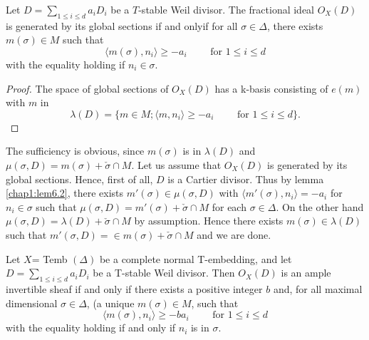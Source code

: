 \begin{lemma}\label{chap1:lem6.3}
Let $D = \sum  \limits_{1 \leq i \leq d} a_i D_i  $ be a $T$-stable
Weil divisor. The fractional ideal $O_X(D)$ is generated by its global
sections if and only\pageoriginale if for all $\sigma \in \Delta$,
there exists $m(\sigma) \in M$ such that   
$$
\langle m (\sigma), n_i \rangle \geq -a_i \qquad \text{ for } 1 \leq i \leq d
$$
with the equality holding if $n_i \in \sigma$.
\end{lemma}

\begin{proof}
The space of global sections of $O_X(D)$ has a k-basis consisting of
$e(m)$ with $m$ in  
$$
\lambda(D) = \{ m \in M ; \langle m , n_i \rangle \geq -a_i \qquad \text{ for } 1
\leq i \leq d \}. 
$$
\end{proof}

The sufficiency is obvious, since $m(\sigma)$ is in $\lambda(D)$ and $\mu
(\sigma,D) = m (\sigma) + \check{\sigma} \cap M$. Let us assume that
$O_X (D)$ is generated by its global sections. Hence, first of all,
$D$ is a Cartier divisor. Thus by lemma \ref{chap1:lem6.2}, there exists $m'
(\sigma) \in \mu (\sigma, D)$ with $ \langle m' (\sigma), n_i \rangle = -a_i$ for
$n_i \in \sigma$ such that $\mu(\sigma,D) = m'(\sigma) +
\check{\sigma} \cap M $ for each $ \sigma \in \Delta$. On the other
hand   $\mu(\sigma,D) = \lambda(D) + \check{\sigma} \cap M $ by
assumption. 
Hence there exists $m(\sigma) \in \lambda(D)$ such that $m'(\sigma,D)
= \in m (\sigma) + \check{\sigma} \cap M $ and we are done. 

\setcounter{theorem}{3}
\begin{theorem}\label{chap1:thm6.4}%
 Let $X$= Temb $(\Delta)$ be a complete normal T-embedding, and let $
 D = \sum \limits _{1 \leq i \leq d} a_i D_i$ be a T-stable Weil
 divisor. Then $O_X (D)$ is an ample invertible sheaf if and only if
 there exists a positive integer $b$ and, for all maximal dimensional
 $\sigma \in \Delta$, (a unique $m(\sigma) \in M$, such that  
 $$
\langle m (\sigma), n_i \rangle \geq -ba_i \qquad \text{ for } 1 \leq
i \leq d 
$$
with the equality holding if and only if $n_i$ is in $\sigma$.
\end{theorem}

